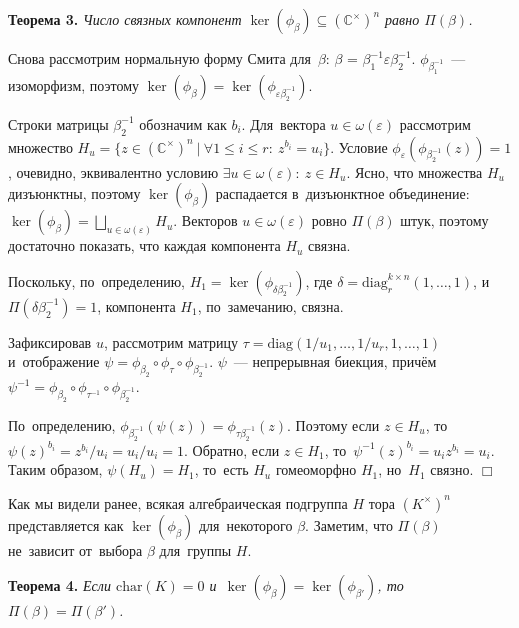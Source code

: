 \documentclass[twoside]{article}
\begin{document}
\medskip\noindent\textbf{Теорема 3.}\emph{
    Число связных компонент $\ker(\phi_\beta) \subseteq ({\mathbb{C}^\times})^n$ равно $\Pi(\beta)$.
}\medskip

    Снова рассмотрим нормальную форму Смита для~$\beta$: $\beta$ = $\beta_1^{-1} \varepsilon \beta_2^{-1}$.
    $\phi_{\beta_1^{-1}}$~— изоморфизм, поэтому $\ker(\phi_{\beta}) = \ker(\phi_{\varepsilon \beta_2^{-1}})$.

    Строки матрицы $\beta_2^{-1}$ обозначим как $b_i$.
    Для~вектора $u \in \omega(\varepsilon)$ рассмотрим множество $H_u = \{z \in ({\mathbb{C}^\times})^n \ | \ \forall 1 \leq i \leq r{:}\ z^{b_i} = u_i\}$.
    Условие $\phi_\varepsilon(\phi_{\beta_2^{-1}}(z)) = 1$, очевидно, эквивалентно условию $\exists u \in \omega(\varepsilon){:}\ z \in H_u$.
    Ясно, что множества $H_u$ дизъюнктны, поэтому $\ker(\phi_{\beta})$ распадается в~дизъюнктное объединение:
    $
        \ker(\phi_{\beta}) = \bigsqcup_{u \in \omega(\varepsilon)} H_u.
    $
    Векторов $u \in \omega(\varepsilon)$ ровно $\Pi(\beta)$ штук, поэтому достаточно показать, что каждая компонента $H_u$ связна.

    Поскольку, по~определению, $H_1 = \ker(\phi_{\delta \beta_2^{-1}})$, где $\delta = \mathrm{diag}^{k \times n}_r(1, \ldots, 1)$,
    и~$\Pi(\delta \beta_2^{-1}) = 1$, компонента $H_1$, по~замечанию, связна.

    Зафиксировав $u$, рассмотрим матрицу $\tau = \mathrm{diag}(1 / u_1, \ldots, 1 / u_r, 1, \ldots, 1)$ и~отображение $\psi = \phi_{\beta_2} \circ \phi_\tau \circ \phi_{\beta_2^{-1}}$.
    $\psi$~— непрерывная биекция, причём $\psi^{-1} = \phi_{\beta_2} \circ \phi_{\tau^{-1}} \circ \phi_{\beta_2^{-1}}$.

    По~определению, $\phi_{\beta_2^{-1}}(\psi(z)) = \phi_{\tau \beta_2^{-1}}(z)$.
    Поэтому если $z \in H_u$, то~$\psi(z)^{b_i} = z^{b_i} / u_i = u_i / u_i = 1$. Обратно, если $z \in H_1$,
    то~$\psi^{-1}(z)^{b_i} = u_i z^{b_i} = u_i$. Таким образом, $\psi(H_u) = H_1$,
    то~есть $H_u$ гомеоморфно $H_1$, но~$H_1$ связно.
\hfill$\Box$\medskip

Как мы видели ранее, всякая алгебраическая подгруппа $H$ тора $(K^\times)^n$ представляется как $\ker(\phi_\beta)$
для~некоторого $\beta$. Заметим, что $\Pi(\beta)$ не~зависит от~выбора $\beta$ для~группы $H$.

\medskip\noindent\textbf{Теорема 4.}\emph{
    Если $\mathrm{char}(K) = 0$ и~$\ker(\phi_{\beta}) = \ker(\phi_{\beta'})$, то~$\Pi(\beta) = \Pi(\beta')$.
}\medskip
\end{document}
